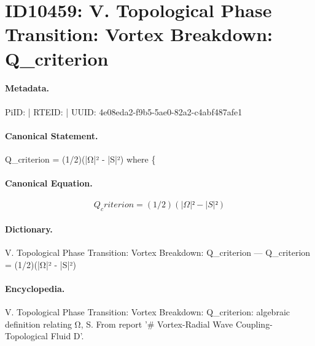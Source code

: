 \section*{ID10459: V. Topological Phase Transition: Vortex Breakdown: Q\_criterion}
\paragraph{Metadata.}
PiID:  | RTEID:  | UUID: 4e08eda2-f9b5-5ae0-82a2-c4abf487afe1

\paragraph{Canonical Statement.}
Q\_criterion = (1/2)(|Ω|² - |S|²) where \{

\paragraph{Canonical Equation.}
\[
Q_criterion = (1/2)(|Ω|² - |S|²)
\]

\paragraph{Dictionary.}
V. Topological Phase Transition: Vortex Breakdown: Q\_criterion — Q\_criterion = (1/2)(|Ω|² - |S|²)

\paragraph{Encyclopedia.}
V. Topological Phase Transition: Vortex Breakdown: Q\_criterion: algebraic definition relating Ω, S. From report '\# Vortex-Radial Wave Coupling- Topological Fluid D'.
